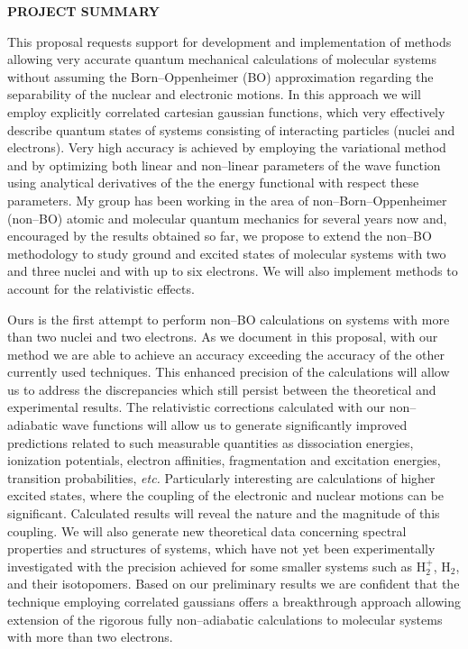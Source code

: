 \setlength{\textwidth}{7in}
\setlength{\textheight}{9.45in}
\setlength{\oddsidemargin}{-.25in}
\setlength{\topmargin}{-.2in}



\setlength{\baselineskip}{1em}


\noindent
{\bf PROJECT SUMMARY}

This proposal requests support for development and implementation
of methods allowing very accurate 
quantum mechanical calculations of molecular systems without
assuming the Born--Oppenheimer (BO) approximation regarding the
separability of the nuclear and electronic motions. In this
approach we will employ explicitly  
correlated cartesian gaussian functions,
which very effectively describe 
quantum states of systems consisting of 
interacting particles (nuclei and electrons).
Very high accuracy is achieved
by employing the variational method and by optimizing
both linear and non--linear parameters of the
wave function using analytical derivatives of the
the energy functional 
with respect these parameters. 
My group has been working in the area of 
non--Born--Oppenheimer (non--BO)
atomic and molecular quantum mechanics 
for several years now and, encouraged by the 
results obtained so far, we propose to extend
the non--BO methodology 
to study 
ground and excited states of
molecular systems with two and three nuclei and
with up to six electrons.
We will also implement methods to account
for the relativistic effects.
 
Ours is the first attempt to perform
non--BO calculations on systems with
more than two nuclei and two electrons. 
As we document in this proposal, 
with our method we are able to achieve an accuracy 
exceeding the accuracy of the 
other currently used techniques.
This enhanced precision of the calculations 
will allow us to address the discrepancies which
still persist between the theoretical and experimental results.
The relativistic corrections calculated 
with our non--adiabatic wave functions will
allow us to generate significantly improved
predictions related to such measurable quantities as
dissociation energies, ionization potentials,
electron affinities, fragmentation and excitation
energies, transition probabilities, {\it etc.}
Particularly interesting are calculations of
higher excited states,
where the coupling of the electronic and nuclear motions
can be significant.
Calculated results will reveal 
the nature and the magnitude of this
coupling.
We will also generate new theoretical data
concerning spectral properties and structures of systems, 
which have not yet been experimentally investigated
with the precision achieved for some smaller systems such as 
H$_2^+$, H$_2$, and their isotopomers.
Based on our preliminary results we are confident
that the technique employing correlated gaussians
offers a breakthrough approach allowing extension of the
rigorous fully non--adiabatic calculations to molecular
systems with more than two electrons. 

